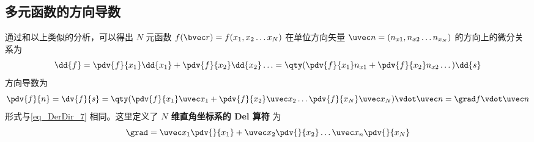 \subsection{多元函数的方向导数}
通过和以上类似的分析，可以得出 $N$ 元函数 $f(\bvec r) = f(x_1,x_2\dots x_N)$ 在单位方向矢量 $\uvec n = (n_{x1}, n_{x2} \dots n_{x_N})$ 的方向上的微分关系为
\begin{equation}
\dd{f} = \pdv{f}{x_1} \dd{x_1} + \pdv{f}{x_2} \dd{x_2}\ldots = \qty( \pdv{f}{x_1}n_{x1} + \pdv{f}{x_2} n_{x2}\dots ) \dd{s}
\end{equation}
方向导数为
\begin{equation}
\pdv{f}{n} = \dv{f}{s} = \qty( \pdv{f}{x_1}\uvec x_1 + \pdv{f}{x_2}\uvec x_2\ldots  \pdv{f}{x_N}\uvec x_N ) \vdot \uvec n = \grad f \vdot \uvec n
\end{equation} 
形式与\autoref{eq_DerDir_7} 相同。这里定义了\textbf{ $N$ 维直角坐标系的 Del 算符} 为
\begin{equation}
\grad  = \uvec x_1\pdv{}{x_1} + \uvec x_2\pdv{}{x_2} \dots \uvec x_n\pdv{}{x_N}
\end{equation}


